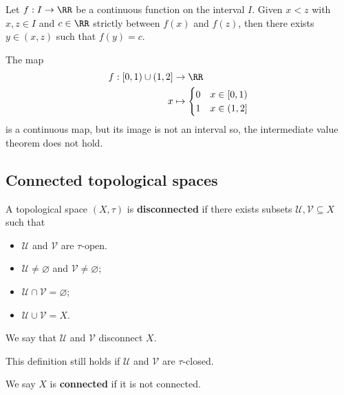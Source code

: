 \documentclass[12pt, a4paper]{article}
\begin{document}
\begin{theorem}
    Let \(f:I \to \RR\) be a continuous function on the interval \(I\). Given \(x<z\) with \(x, z \in I\) and \(c \in \RR\) strictly between \(f(x)\) and \(f(z)\), then there exists \(y \in (x,z)\) such that \(f(y)=c\).
\end{theorem}

\begin{example}
    The map 
    \[\begin{aligned}
        f: [0,1) \cup (1,2] &\to \RR \\
        x &\mapsto \begin{cases}
            0 &x \in [0,1) \\
            1 &x \in (1,2]
        \end{cases}
    \end{aligned}\]
    is a continuous map, but its image is not an interval so, the intermediate value theorem does not hold.
\end{example}

\subsection{Connected topological spaces}

\begin{definition}
    A topological space \((X,\tau)\) is \textbf{disconnected} if there exists subsets \(\mathcal{U},\mathcal{V} \subseteq X\) such that 
    \begin{itemize}
        \item \(\mathcal{U}\) and \(\mathcal{V}\) are \(\tau\)-open.
        \item \(\mathcal{U} \neq \varnothing\) and \(\mathcal{V}\neq \varnothing\);
        \item \(\mathcal{U} \cap \mathcal{V} = \varnothing\);
        \item \(\mathcal{U} \cup \mathcal{V} = X\).
    \end{itemize}
    We say that \(\mathcal{U}\) and \(\mathcal{V}\) disconnect \(X\). 
\end{definition}

\begin{mdremark}
    This definition still holds if \(\mathcal{U}\) and \(\mathcal{V}\) are \(\tau\)-closed.
\end{mdremark}

\begin{definition}
    We say \(X\) is \textbf{connected} if it is not connected.
\end{definition}
\end{document}
